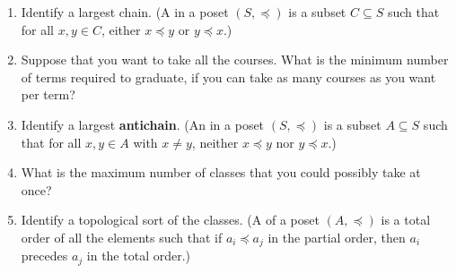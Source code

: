 \documentclass[12pt]{article}
\newcommand{\mfigure}[3]{\bigskip\centerline{\resizebox{#1}{#2}{\texttt{[image: \#3]}}}\bigskip}
\begin{document}
\begin{enumerate}
\begin{enumerate}
\solution[\vspace{3in}]{
\ \\
\mfigure{!}{2.5in}{rec11-hasse}
}

\item Identify a largest chain.  (A  in a poset $(S,
\preceq)$ is a subset $C \subseteq S$ such that for all $x, y \in C$,
either $x \preceq y$ or $y \preceq x$.)


\item Suppose that you want to take all the courses.  What is the
minimum number of terms required to graduate, if you can take as many
courses as you want per term?


\item Identify a largest \textbf{antichain}.  (An  in
a poset $(S, \preceq)$ is a subset $A \subseteq S$ such that for all
$x, y \in A$ with $x\ne y$, neither $x \preceq y$ nor $y \preceq x$.)


\item What is the maximum number of classes that you could possibly
take at once?


\item Identify a topological sort of the classes.  (A
 of a poset $(A, \preceq)$ is a total order of
all the elements such that if $a_i \preceq a_j$ in the partial order,
then $a_i$ precedes $a_j$ in the total order.)



\end{enumerate}
\end{enumerate}
\end{document}
